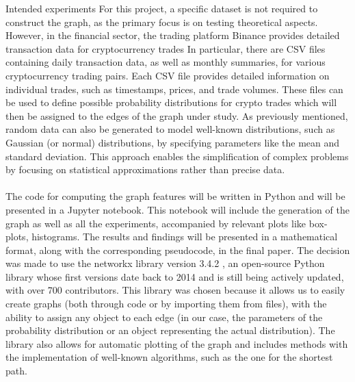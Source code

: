 \begin{projsection}{Intended experiments}
For this project, a specific dataset is not required to construct the graph, as the primary focus is on testing theoretical aspects. However, in the financial sector, the trading platform Binance provides detailed transaction data for cryptocurrency trades \cite{LINK URL}
In particular, there are CSV files containing daily transaction data, as well as monthly summaries, for various cryptocurrency trading pairs. Each CSV file provides detailed information on individual trades, such as timestamps, prices, and trade volumes. These files can be used to define possible probability distributions for crypto trades which will then be assigned to the edges of the graph under study.
As previously mentioned, random data can also be generated to model well-known distributions, such as Gaussian (or normal) distributions, by specifying parameters like the mean and standard deviation. This approach enables the simplification of complex problems by focusing on statistical approximations rather than precise data. \\\\

The code for computing the graph features will be written in Python and will be presented in a Jupyter notebook. This notebook will include the generation of the graph as well as all the experiments, accompanied by relevant plots like box-plots, histograms. The results and findings will be presented in a mathematical format, along with the corresponding pseudocode, in the final paper. 
The decision was made to use the networkx library version 3.4.2 \cite{LINK_GITHUIB}, an open-source Python library whose first versions date back to 2014 and is still being actively updated, with over 700 contributors. This library was chosen because it allows us to easily create graphs (both through code or by importing them from files), with the ability to assign any object to each edge (in our case, the parameters of the probability distribution or an object representing the actual distribution). The library also allows for automatic plotting of the graph and includes methods with the implementation of well-known algorithms, such as the one for the shortest path.

\end{projsection}